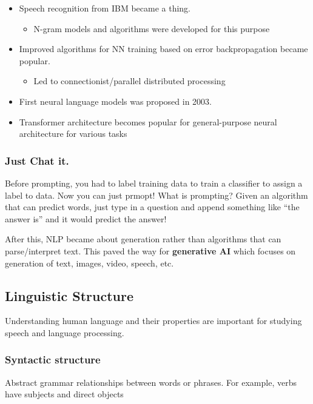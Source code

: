 \documentclass[11pt]{article}
\begin{document}
\begin{itemize}
	\item Speech recognition from IBM became a thing.
	      \begin{itemize}
		      \item N-gram models and algorithms were developed for this purpose
	      \end{itemize}
	\item Improved algorithms for NN training based on error backpropagation
	      became popular.
	      \begin{itemize}
		      \item Led to connectionist/parallel distributed processing
	      \end{itemize}
	\item First neural language models was proposed in 2003.
	\item Transformer architecture becomes popular for general-purpose neural
	      architecture for various tasks
\end{itemize}

\subsubsection{Just Chat it.}

Before prompting, you had to label training data to train a classifier to assign
a label to data. Now you can just prmopt! What is prompting? Given an algorithm
that can predict words, just type in a question and append something like ``the
answer is'' and it would predict the answer!

After this, NLP became about generation rather than algorithms that can parse/interpret text. This paved the way for \textbf{generative AI} which focuses on generation of text, images, video, speech, etc.

\subsection{Linguistic Structure}

Understanding human language and their properties are important for studying speech and language processing.

\subsubsection{Syntactic structure}

Abstract grammar relationships between words or phrases. For example, verbs have
subjects and direct objects
\end{document}
